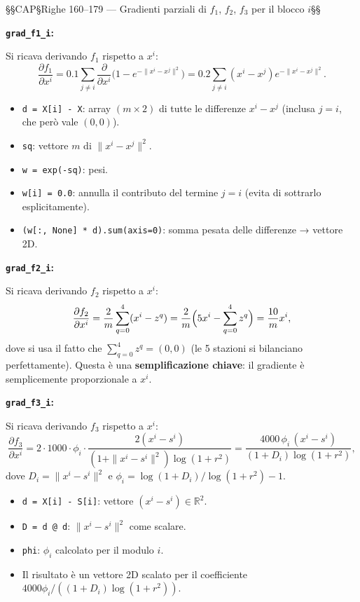 \documentclass[12pt,a4paper]{article}
\theoremstyle{definition}
\newcommand{\R}{\mathbb{R}}
\begin{document}
§§CAP§Righe 160–179 — Gradienti parziali di $f_1$, $f_2$, $f_3$ per il blocco $i$§§



\textbf{\texttt{grad\_f1\_i}:}

Si ricava derivando $f_1$ rispetto a $x^i$:
\[
  \frac{\partial f_1}{\partial x^i} = 0.1 \sum_{j \neq i} \frac{\partial}{\partial x^i}
  \bigl(1 - e^{-\|x^i - x^j\|^2}\bigr)
  = 0.2 \sum_{j \neq i} (x^i - x^j) e^{-\|x^i - x^j\|^2}.
\]
\begin{itemize}[nosep]
  \item \texttt{d = X[i] - X}: array $(m \times 2)$ di tutte le differenze $x^i - x^j$
        (inclusa $j=i$, che però vale $(0,0)$).
  \item \texttt{sq}: vettore $m$ di $\|x^i - x^j\|^2$.
  \item \texttt{w = exp(-sq)}: pesi.
  \item \texttt{w[i] = 0.0}: annulla il contributo del termine $j=i$ (evita di sottrarlo esplicitamente).
  \item \texttt{(w[:, None] * d).sum(axis=0)}: somma pesata delle differenze → vettore 2D.
\end{itemize}

\textbf{\texttt{grad\_f2\_i}:}

Si ricava derivando $f_2$ rispetto a $x^i$:
\[
  \frac{\partial f_2}{\partial x^i}
  = \frac{2}{m} \sum_{q=0}^{4} (x^i - z^q)
  = \frac{2}{m} \Bigl(5 x^i - \sum_{q=0}^4 z^q\Bigr)
  = \frac{10}{m} x^i,
\]
dove si usa il fatto che $\sum_{q=0}^4 z^q = (0,0)$ (le 5 stazioni si bilanciano perfettamente).
Questa è una \textbf{semplificazione chiave}: il gradiente è semplicemente proporzionale a $x^i$.

\textbf{\texttt{grad\_f3\_i}:}

Si ricava derivando $f_3$ rispetto a $x^i$:
\[
  \frac{\partial f_3}{\partial x^i}
  = 2 \cdot 1000 \cdot \phi_i \cdot \frac{2(x^i - s^i)}{(1 + \|x^i - s^i\|^2)\log(1+r^2)}
  = \frac{4000 \, \phi_i \,(x^i - s^i)}{(1 + D_i)\log(1+r^2)},
\]
dove $D_i = \|x^i - s^i\|^2$ e $\phi_i = \log(1+D_i)/\log(1+r^2) - 1$.
\begin{itemize}[nosep]
  \item \texttt{d = X[i] - S[i]}: vettore $(x^i - s^i) \in \R^2$.
  \item \texttt{D = d @ d}: $\|x^i - s^i\|^2$ come scalare.
  \item \texttt{phi}: $\phi_i$ calcolato per il modulo $i$.
  \item Il risultato è un vettore 2D scalato per il coefficiente $4000\phi_i / ((1+D_i)\log(1+r^2))$.
\end{itemize}
\end{document}
